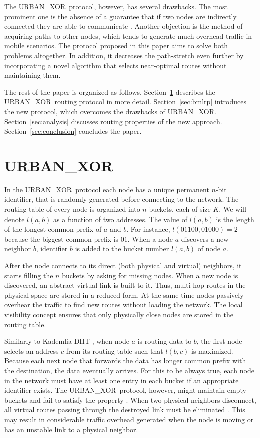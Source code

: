 \documentclass[conference]{IEEEtran}
\theoremstyle{definition}
\newcommand{\urbanxor}{URBAN\_XOR}
\begin{document}
The \urbanxor\ protocol, however, has several drawbacks. The most prominent one is the absence of a guarantee that if two nodes are indirectly connected they are able to communicate \cite{Pasquini}. Another objection is the method of acquiring paths to other nodes, which tends to generate much overhead traffic in mobile scenarios. The protocol proposed in this paper aims to solve both problems altogether. {\color{orange} In addition, it decreases the path-stretch even further by incorporating a novel algorithm that selects near-optimal routes without maintaining them.}

The rest of the paper is organized as follows. Section~\ref{sec:urbanxor} describes the \urbanxor\ routing protocol in more detail. Section~\ref{sec:bmlrp} introduces the new protocol, which overcomes the drawbacks of \urbanxor. 
Section~\ref{sec:analysis} discusses routing properties of the new approach. 
Section~\ref{sec:conclusion} concludes the paper.


\section{\urbanxor}
\label{sec:urbanxor}

In the \urbanxor\ protocol each node has a unique permanent $n$-bit identifier, that is randomly generated before connecting to the network. The routing table of every node is organized into $n$ buckets, each of size $K$. We will denote $l(a,b)$ as a function of two addresses. The value of $l(a,b)$ is the length of the longest common prefix of $a$ and $b$. For instance, $l(01100, 01000) = 2$ because the biggest common prefix is $01$. When a node $a$ discovers a new neighbor $b$, identifier $b$ is added to the bucket number $l(a,b)$ of node $a$.

After the node connects to its direct (both physical and virtual) neighbors, it starts filling the $n$ buckets by asking for missing nodes. When a new node is discovered, an abstract virtual link is built to it. Thus, multi-hop routes in the physical space are stored in a reduced form. At the same time nodes passively overhear the traffic to find new routes without loading the network. The local visibility concept ensures that only physically close nodes are stored in the routing table.

Similarly to Kademlia DHT \cite{kademlia}, when node $a$ is routing data to $b$, the first node selects an address $c$ from its routing table such that $l(b,c)$ is maximized. Because each next node that forwards the data has longer common prefix with the destination, the data eventually arrives. For this to be always true, each node in the network must have at least one entry in each bucket if an appropriate identifier exists. The \urbanxor\ protocol, however, might maintain empty buckets and fail to satisfy the property \cite{Pasquini}. When two physical neighbors disconnect, all virtual routes passing through the destroyed link must be eliminated \cite{Pasquini}. This may result in considerable traffic overhead generated when the node is moving or has an unstable link to a physical neighbor.
\end{document}
